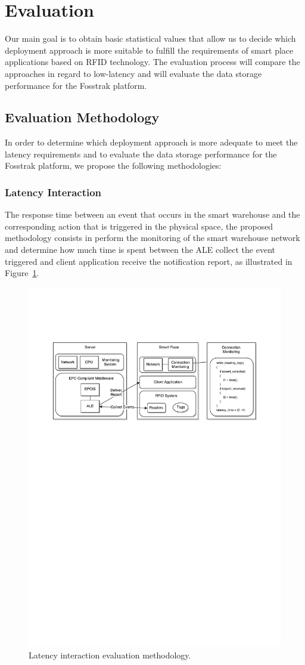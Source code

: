 
\section{Evaluation}
\label{sec:evaluation}
Our main goal is to obtain basic statistical values that allow us to decide which deployment
approach is more suitable to fulfill the requirements of smart place applications based on \gls{RFID}
technology. The evaluation process will compare the approaches in regard to low-latency and will
evaluate the data storage performance for the Fosstrak platform.

\subsection{Evaluation Methodology}
\label{sub:eval_methodology}
In order to determine which deployment approach is more adequate to meet the latency requirements and to
evaluate the data storage performance for the Fosstrak platform, we propose the following
methodologies:

\subsubsection{Latency Interaction}
\label{sub:eval_methodology_latency}
The response time between an event that occurs in the smart warehouse and the corresponding action
that is triggered in the physical space, the proposed methodology consists in perform the monitoring
of the smart warehouse network and determine how much time is spent between the \gls{ALE} collect the
event triggered and client application receive the notification report, as illustrated in
Figure~\ref{fig:eval_latency_methodology}.

\begin{figure}[ht!]
  \centering
  \includegraphics[width=.5\textwidth]{./figures/eval_latency_methodology}
  \caption[Latency evaluation methodology.]{Latency interaction evaluation methodology.}
  \label{fig:eval_latency_methodology}
\end{figure}

